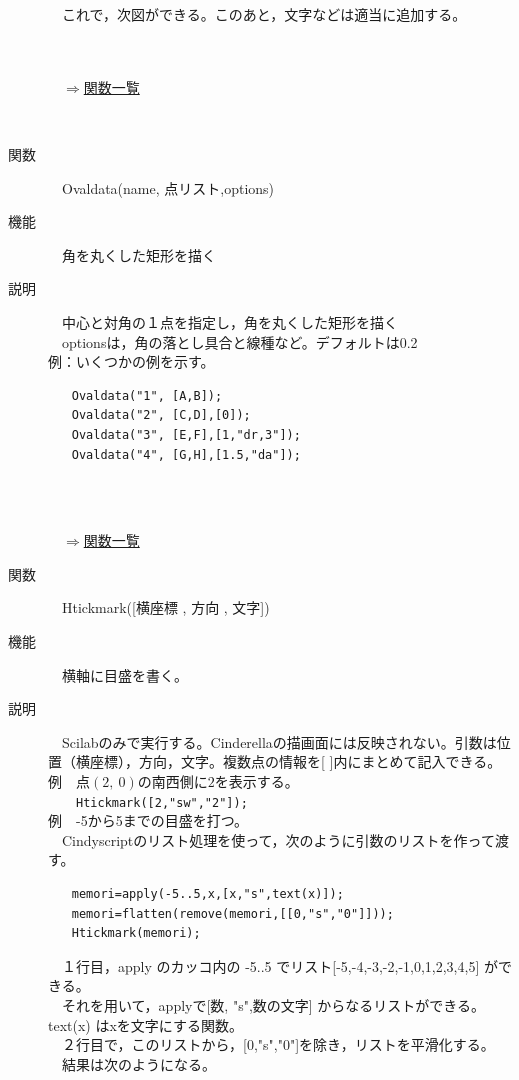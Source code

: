 \documentclass[papersize,a4paper,12pt,uplatex]{jsarticle}
\begin{document}
\begin{description}
　これで，次図ができる。このあと，文字などは適当に追加する。\\
　\\
　　　　　　　　　　　
　\\
\begin{flushright}　\hyperlink{functionlist}{$\Rightarrow$関数一覧}\end{flushright}
　\\
\hypertarget{ovaldata}{}
\item[関数]　Ovaldata(name, 点リスト,options)
\item[機能]　角を丸くした矩形を描く
\item[説明]　中心と対角の１点を指定し，角を丸くした矩形を描く\\
　optionsは，角の落とし具合と線種など。デフォルトは0.2 \\

例：いくつかの例を示す。
\begin{verbatim}
　　Ovaldata("1", [A,B]);
　　Ovaldata("2", [C,D],[0]);
　　Ovaldata("3", [E,F],[1,"dr,3"]);
　　Ovaldata("4", [G,H],[1.5,"da"]);
\end{verbatim}
　\\
　\\
\begin{flushright}　\hyperlink{functionlist}{$\Rightarrow$関数一覧}\end{flushright}

\hypertarget{htickmark}{}
\item[関数]　Htickmark([横座標 , 方向 , 文字])
\item[機能]　横軸に目盛を書く。
\item[説明]　Scilabのみで実行する。Cinderellaの描画面には反映されない。引数は位置（横座標），方向，文字。複数点の情報を[ ]内にまとめて記入できる。\\

例　点$(2,\ 0)$の南西側に$2$を表示する。\\
　　\verb|Htickmark([2,"sw","2"]);|\\

例　-5から5までの目盛を打つ。\\
　Cindyscriptのリスト処理を使って，次のように引数のリストを作って渡す。
\begin{verbatim}
　　memori=apply(-5..5,x,[x,"s",text(x)]);
　　memori=flatten(remove(memori,[[0,"s","0"]]));
　　Htickmark(memori);
\end{verbatim}
　１行目，apply のカッコ内の -5..5 でリスト[-5,-4,-3,-2,-1,0,1,2,3,4,5] ができる。\\
　それを用いて，applyで[数, "s",数の文字] からなるリストができる。text(x) はxを文字にする関数。\\
　２行目で，このリストから，[0,"s","0"]を除き，リストを平滑化する。\\
　結果は次のようになる。\\


\end{description}
\end{document}
